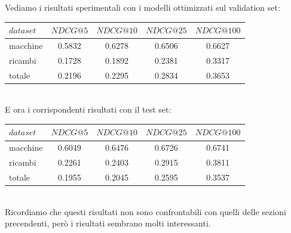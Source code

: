 Vediamo i risultati sperimentali con i modelli ottimizzati sul validation set:\\

\begin{tabular}{|l|cccc|}
    \toprule
    $dataset$  &  $NDCG@5$ & $NDCG@10$  & $NDCG@25$ & $NDCG@100$  \\
    \midrule
    macchine & 0.5832 & 0.6278 & 0.6506 & 0.6627 \\
    ricambi & 0.1728 & 0.1892 & 0.2381 & 0.3317 \\
    totale  & 0.2196 & 0.2295 & 0.2834 & 0.3653 \\
\bottomrule
\end{tabular}\\

E ora i corrispondenti risultati con il test set:\\

\begin{tabular}{|l|cccc|}
    \toprule
    $dataset$  &  $NDCG@5$ & $NDCG@10$  & $NDCG@25$ & $NDCG@100$  \\
    \midrule
    macchine & 0.6049 & 0.6476 & 0.6726 & 0.6741 \\
    ricambi & 0.2261 & 0.2403 & 0.2915 & 0.3811 \\
    totale  & 0.1955 & 0.2045 & 0.2595 & 0.3537 \\
\bottomrule
\end{tabular}\\

Ricordiamo che questi risultati non sono confrontabili con quelli delle sezioni precendenti, però i risultati sembrano molti interessanti.